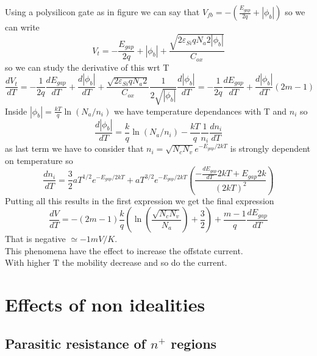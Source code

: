 Using a polysilicon gate as in figure we can say that $V_{fb}=-(\frac{E_{gap}}{2q}+|\phi_b|)$ so we can write 
\begin{equation}
V_t=-\frac{E_{gap}}{2q}+|\phi_b|+\frac{\sqrt{2\varepsilon_{Si}qN_a2|\phi_b|}}{C_{ox}}
\end{equation}
so we can study the derivative of this wrt T
\begin{equation}
\frac{dV_t}{dT}=-\frac{1}{2q}\frac{dE_{gap}}{dT}+\frac{d|\phi_b|}{dT}+\frac{\sqrt{2\varepsilon_{Si}qN_a2}}{C_{ox}}\frac{1}{2\sqrt{|\phi_b|}}\frac{d|\phi_b|}{dT}=-\frac{1}{2q}\frac{dE_{gap}}{dT}+\frac{d|\phi_b|}{dT}(2m-1)
\end{equation}
Inside $|\phi_b|=\frac{kT}{q}\ln(N_a/n_i)$ we have temperature dependances with T and $n_i$ so 
\begin{equation}
\frac{d|\phi_b|}{dT}=\frac{k}{q}\ln(N_a/n_i)-\frac{kT}{q}\frac{1}{n_i}\frac{dn_i}{dT}
\end{equation}
as last term we have to consider that $n_i=\sqrt{N_cN_v}e^{-E_{gap}/2kT}$ is strongly dependent on temperature so 
\begin{equation}
\frac{dn_i}{dT}=\frac{3}{2}aT^{1/2}e^{-E_{gap}/2kT}+aT^{3/2}e^{-E_{gap}/2kT}\left(\frac{-\frac{dE_{gap}}{dT}2kT+E_{gap}2k}{(2kT)^2}\right)
\end{equation}
Putting all this results in the first expression we get the final expression
\begin{equation}
\frac{dV}{dT}=-(2m-1)\frac{k}{q}\left(\ln(\frac{\sqrt{N_cN_v}}{N_a})+\frac{3}{2}\right) +\frac{m-1}{q}\frac{dE_{gap}}{dT}
\end{equation}
That is negative $\simeq -1mV/K$.\\
This phenomena have the effect to increase the offstate current.\\
With higher T the mobility decrease and so do the current.\\


\section{Effects of non idealities}

\subsection{Parasitic resistance of $n^+$ regions}


